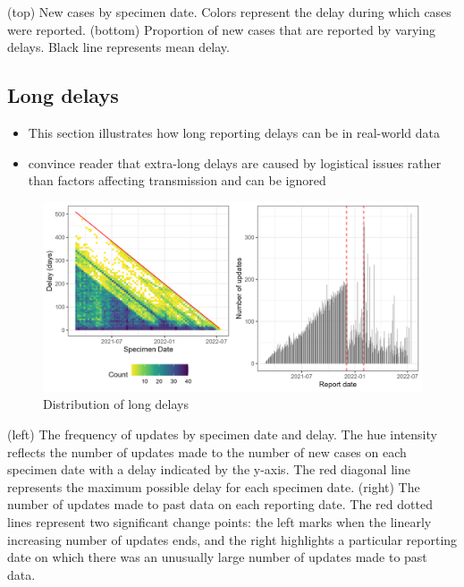 \documentclass[
  a4paper,
]{article}
\providecommand{\tightlist}{%
  \setlength{\itemsep}{0pt}\setlength{\parskip}{0pt}}\usepackage{longtable,booktabs,array}
\begin{document}
(top) New cases by specimen date. Colors represent the delay during
which cases were reported. (bottom) Proportion of new cases that are
reported by varying delays. Black line represents mean delay.

\hypertarget{long-delays}{%
\subsection{Long delays}\label{long-delays}}

\begin{itemize}
\tightlist
\item
  This section illustrates how long reporting delays can be in
  real-world data
\item
  convince reader that extra-long delays are caused by logistical issues
  rather than factors affecting transmission and can be ignored
\end{itemize}

\begin{figure}

{\centering \includegraphics{images/long-delay-dist.png}

}

\caption{Distribution of long delays}

\end{figure}

(left) The frequency of updates by specimen date and delay. The hue
intensity reflects the number of updates made to the number of new cases
on each specimen date with a delay indicated by the y-axis. The red
diagonal line represents the maximum possible delay for each specimen
date. (right) The number of updates made to past data on each reporting
date. The red dotted lines represent two significant change points: the
left marks when the linearly increasing number of updates ends, and the
right highlights a particular reporting date on which there was an
unusually large number of updates made to past data.
\end{document}
